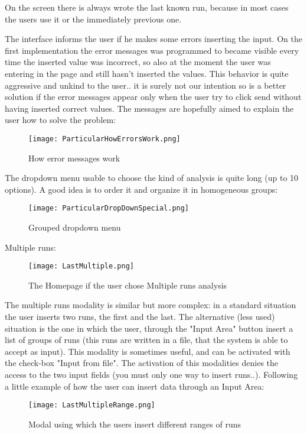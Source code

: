 On the screen there is always wrote the last known run, because in most cases the users use it or the immediately previous one. 

The interface informs the user if he makes some errors inserting the input. On the first implementation the error messages was programmed to became visible every time the inserted value was incorrect, so also at the moment the user was entering in the page and still hasn't inserted the values. This behavior is quite aggressive and unkind to the user.. it is surely not our intention so is a better solution if the error messages appear only when the user try to click send without having inserted correct values. The messages are hopefully aimed to explain the user how to solve the problem:

\begin{figure}[H]
\centering
\texttt{[image: ParticularHowErrorsWork.png]} 
\caption{How error messages work}
\end{figure}    


\newpage
The dropdown menu usable to choose the kind of analysis is quite long (up to 10 options). A good idea is to order it and organize it in homogeneous groups:

\begin{figure}[H]
\centering
\texttt{[image: ParticularDropDownSpecial.png]} 
\caption{Grouped dropdown menu}
\end{figure}    

  
Multiple runs:  

\begin{figure}[H]
\centering
\texttt{[image: LastMultiple.png]} 
\caption{The Homepage if the user chose Multiple runs analysis}
\end{figure}    

The multiple runs modality is similar but more complex: in a standard situation the user inserts two runs, the first and the last. The alternative (less used) situation is the one in which the user, through the "Input Area" button insert a  list of groups of runs (this runs are written in a file, that the system is able to accept as input). This modality is sometimes useful, and can be activated with the check-box "Input from file". The activation of this modalities denies the access to the two input fields (you must only one way to insert runs..).
Following a little example of how the user can insert data through an Input Area:

\begin{figure}[H]
\centering
\texttt{[image: LastMultipleRange.png]} 
\caption{Modal using which the users insert different ranges of runs }
\end{figure}   

